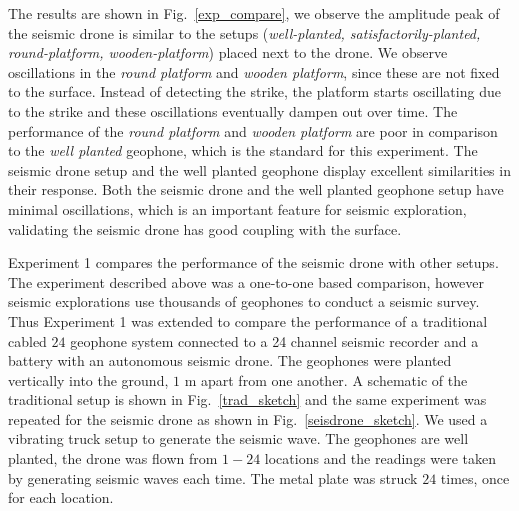 The results are shown in Fig.~\ref{exp_compare}, we observe the amplitude peak of the seismic drone is similar to the setups (\emph{well-planted, satisfactorily-planted, round-platform, wooden-platform}) placed next to the drone. We observe oscillations in the \emph{round platform} and \emph{wooden platform}, since these are not fixed to the surface. Instead of detecting the strike, the platform starts oscillating due to the strike and these oscillations eventually dampen out over time. The performance of the \emph{round platform} and \emph{wooden platform} are poor in comparison to the \emph{well planted} geophone, which is the standard for this experiment. The seismic drone setup and the well planted geophone display excellent similarities in their response. Both the seismic drone and the well planted geophone setup have minimal oscillations, which is an important feature for seismic exploration, validating the seismic drone has good coupling with the surface.  

Experiment 1 compares the performance of the seismic drone with other setups. The experiment described above was a one-to-one based comparison, however seismic explorations use thousands of geophones to conduct a seismic survey. Thus Experiment 1 was extended to compare the performance of a traditional cabled $24$ geophone system connected to a 24 channel seismic recorder and a battery with an autonomous seismic drone. The geophones were planted vertically into the ground, $1$ m apart from one another.  A schematic of the traditional setup is shown in Fig.~\ref{trad_sketch} and the same experiment was repeated for the seismic drone as shown in Fig.~\ref{seisdrone_sketch}. We used a vibrating truck setup to generate the seismic wave. The geophones are well planted, the drone was flown from $1-24$ locations and the readings were taken by generating seismic waves each time. The metal plate was struck $24$ times, once for each location.

